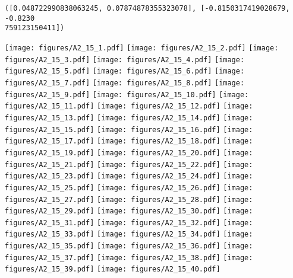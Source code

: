 \documentclass[12pt,a4paper]{article}
\begin{document}
\begin{lstlisting}
([0.048722990838063245, 0.07874878355323078], [-0.8150317419028679, -0.8230
759123150411])
\end{lstlisting}

\texttt{[image: figures/A2\_15\_1.pdf]}
\texttt{[image: figures/A2\_15\_2.pdf]}
\texttt{[image: figures/A2\_15\_3.pdf]}
\texttt{[image: figures/A2\_15\_4.pdf]}
\texttt{[image: figures/A2\_15\_5.pdf]}
\texttt{[image: figures/A2\_15\_6.pdf]}
\texttt{[image: figures/A2\_15\_7.pdf]}
\texttt{[image: figures/A2\_15\_8.pdf]}
\texttt{[image: figures/A2\_15\_9.pdf]}
\texttt{[image: figures/A2\_15\_10.pdf]}
\texttt{[image: figures/A2\_15\_11.pdf]}
\texttt{[image: figures/A2\_15\_12.pdf]}
\texttt{[image: figures/A2\_15\_13.pdf]}
\texttt{[image: figures/A2\_15\_14.pdf]}
\texttt{[image: figures/A2\_15\_15.pdf]}
\texttt{[image: figures/A2\_15\_16.pdf]}
\texttt{[image: figures/A2\_15\_17.pdf]}
\texttt{[image: figures/A2\_15\_18.pdf]}
\texttt{[image: figures/A2\_15\_19.pdf]}
\texttt{[image: figures/A2\_15\_20.pdf]}
\texttt{[image: figures/A2\_15\_21.pdf]}
\texttt{[image: figures/A2\_15\_22.pdf]}
\texttt{[image: figures/A2\_15\_23.pdf]}
\texttt{[image: figures/A2\_15\_24.pdf]}
\texttt{[image: figures/A2\_15\_25.pdf]}
\texttt{[image: figures/A2\_15\_26.pdf]}
\texttt{[image: figures/A2\_15\_27.pdf]}
\texttt{[image: figures/A2\_15\_28.pdf]}
\texttt{[image: figures/A2\_15\_29.pdf]}
\texttt{[image: figures/A2\_15\_30.pdf]}
\texttt{[image: figures/A2\_15\_31.pdf]}
\texttt{[image: figures/A2\_15\_32.pdf]}
\texttt{[image: figures/A2\_15\_33.pdf]}
\texttt{[image: figures/A2\_15\_34.pdf]}
\texttt{[image: figures/A2\_15\_35.pdf]}
\texttt{[image: figures/A2\_15\_36.pdf]}
\texttt{[image: figures/A2\_15\_37.pdf]}
\texttt{[image: figures/A2\_15\_38.pdf]}
\texttt{[image: figures/A2\_15\_39.pdf]}
\texttt{[image: figures/A2\_15\_40.pdf]}
\end{document}
